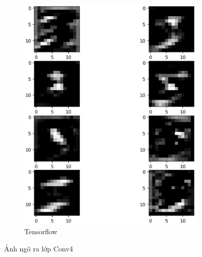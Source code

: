 \begin{figure}[H]
\begin{subfigure}[b]{0.45\linewidth}
        \includegraphics[width=1\linewidth]{Images/cnnc4.png}
        \caption{Tensorflow}
        \label{fig:enter-label}
        \end{subfigure}
    \caption{Ảnh ngõ ra lớp Conv4}
    \label{fig:main}
\end{figure}


